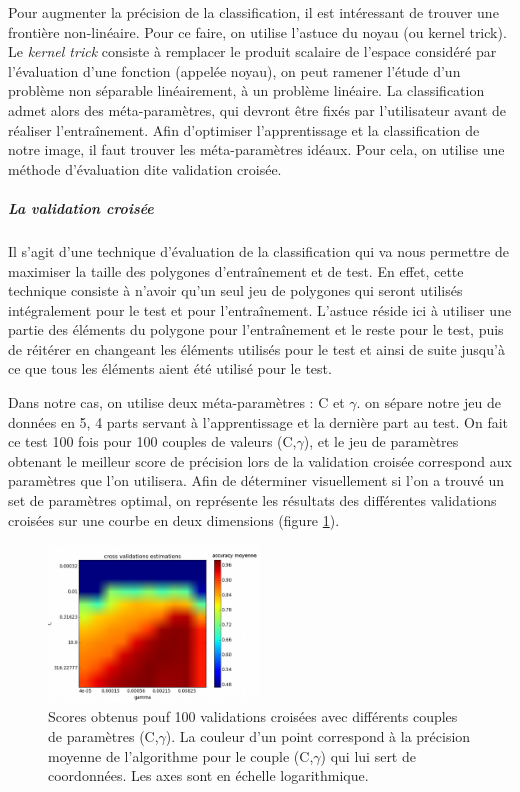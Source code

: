 \documentclass[a4paper,10pt]{article}
\begin{document}
Pour augmenter la précision de la classification, il est intéressant de trouver une frontière non-linéaire. Pour ce faire, on utilise l'astuce du noyau (ou kernel trick). Le \textit{kernel trick}\cite{aizermanSVM} consiste à remplacer le produit scalaire de l'espace considéré par l'évaluation d'une fonction (appelée noyau), on peut ramener l'étude d'un problème non séparable linéairement, à un problème linéaire. La classification admet alors des méta-paramètres, qui devront être fixés par l'utilisateur avant de réaliser l'entraînement. Afin d'optimiser l'apprentissage et la classification de notre image, il faut trouver les méta-paramètres idéaux. Pour cela, on utilise une méthode d'évaluation dite validation croisée.

\subparagraph{La validation croisée\newline}
Il s'agit d'une technique d'évaluation de la classification qui va nous permettre de maximiser la taille des polygones d'entraînement et de test. En effet, cette technique consiste à n'avoir qu'un seul jeu de polygones qui seront utilisés intégralement pour le test et pour l'entraînement. L'astuce réside ici à utiliser une partie des éléments du polygone pour l'entraînement et le reste pour le test, puis de réitérer en changeant les éléments utilisés pour le test et ainsi de suite jusqu'à ce que tous les éléments aient été utilisé pour le test.


Dans notre cas, on utilise deux méta-paramètres : C et $\gamma$. on sépare notre jeu de données en 5, 4 parts servant à l'apprentissage et la dernière part au test. On fait ce test 100 fois pour 100 couples de valeurs (C,$\gamma$), et le jeu de paramètres obtenant le meilleur score de précision lors de la validation croisée correspond aux paramètres que l'on utilisera. Afin de déterminer visuellement si l'on a trouvé un set de paramètres optimal, on représente les résultats des différentes validations croisées sur une courbe en deux dimensions (figure \ref{fig:crossMap}).

\begin{figure}[H]
  \centering
    \includegraphics[width=0.5\textwidth]{crossValLog}
  \caption{Scores obtenus pouf 100 validations croisées avec différents couples de paramètres (C,$\gamma$). La couleur d'un point correspond à la précision moyenne de l'algorithme pour le couple (C,$\gamma$) qui lui sert de coordonnées. Les axes sont en échelle logarithmique.}
  \label{fig:crossMap}
\end{figure}
\end{document}
